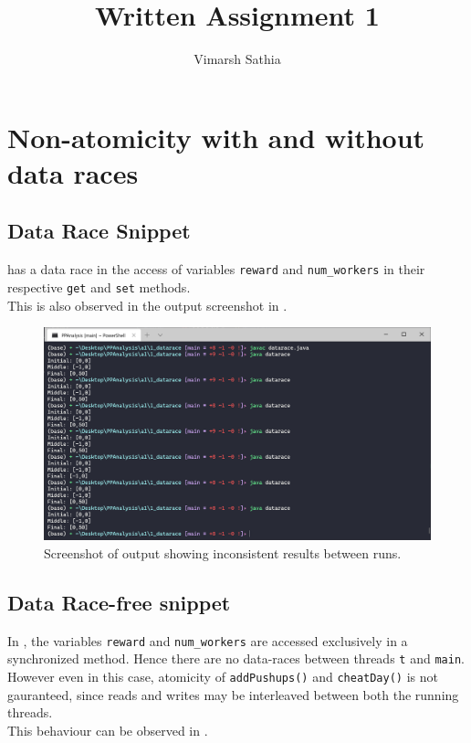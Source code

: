 \documentclass{article}
\title{Written Assignment 1}
\author{Vimarsh Sathia}
\begin{document}
  \maketitle
	\thispagestyle{fancy}
	\section{Non-atomicity with and without data races}
    
    \subsection{Data Race Snippet}
       has a data race in the access of variables \lstinline!reward! and \lstinline!num_workers! in their respective \lstinline!get! and \lstinline!set! methods. \\
      This is also observed in the output screenshot in .

      

      \begin{figure}[h]
        \centering
        \includegraphics[scale=0.7]{1_datarace/datarace_output.png}
        \caption{Screenshot of output showing inconsistent results between runs.}
        \label{fig::11}
      \end{figure}
    
    \subsection{Data Race-free snippet}

      In , the variables \lstinline!reward! and \lstinline!num_workers! are accessed exclusively in a synchronized method. Hence there are no data-races between threads \lstinline!t! and \lstinline!main!. \\
      However even in this case, atomicity of \lstinline!addPushups()! and \lstinline!cheatDay()! is not gauranteed, since reads and writes may be interleaved between both the running threads.\\
      This behaviour can be observed in .
\end{document}
